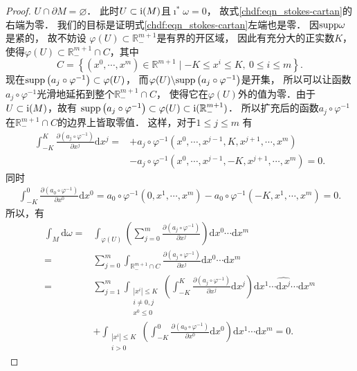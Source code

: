 \begin{proof}
     $U \cap \partial M=\varnothing$．
    此时$U \subset {\rm i}(M)$且$\imath^* \omega=0$，
    故式\eqref{chdf:eqn_stokes-cartan}的右端为零．
    我们的目标是证明式\eqref{chdf:eqn_stokes-cartan}左端也是零．
    因${\rm supp} \omega$是紧的，
    故不妨设 $\varphi(U) \subset \mathbb{R}_{-}^{m+1}$是有界的开区域，
    因此有充分大的正实数$K$，使得$ \varphi(U) \subset \mathbb{R}_{-}^{m+1} \cap C$，其中
    \begin{equation}\label{chdf:eqn_sc-C}
    	C=\left\{\left(x^0, \cdots, x^m\right) \in \mathbb{R}^{m+1} \mid 
    	-K \leqslant x^i \leqslant K, \ 0 \leqslant i \leqslant m \right\} .
    \end{equation}
    现在${\rm supp}\left(a_j \circ \varphi^{-1}\right) \subset \varphi(U)$，
    而$\varphi(U) \backslash {\rm supp}\left(a_j \circ \varphi^{-1}\right)$是开集，
    所以可以让函数$a_j \circ \varphi^{-1}$光滑地延拓到整个$\mathbb{R}_{-}^{m+1} \cap C$，
    使得它在$\varphi(U)$外的值为零．由于$U \subset {\rm i}(M)$，故有
    ${\rm supp}\left(a_j \circ \varphi^{-1}\right) \subset \varphi(U) \subset {\rm i} (\mathbb{R}_{-}^{m+1})$．
    所以扩充后的函数$a_j \circ \varphi^{-1}$在$\mathbb{R}_{-}^{m+1} \cap C$的边界上皆取零值．
    这样，对于$1 \leqslant j \leqslant m$ 有
    \begin{align*}
    	\int_{-K}^K \frac{\partial\left(a_j \circ \varphi^{-1}\right)}{\partial x^j} \mathrm{d} x^j 
    	= & +a_j \circ \varphi^{-1}\left(x^0, \cdots, x^{j-1}, K, x^{j+1}, \cdots, x^m\right) \\
    	& -a_j \circ \varphi^{-1}\left(x^0, \cdots, x^{j-1},-K, x^{j+1}, \cdots, x^m\right) 
    	=  0.
    \end{align*}
    同时
    \begin{align*}
    \int_{-K}^0 \frac{\partial\left(a_0 \circ \varphi^{-1}\right)}{\partial x^0} \mathrm{d} x^0
    =a_0 \circ \varphi^{-1}\left(0, x^1, \cdots, x^{m} \right)
    -a_0 \circ \varphi^{-1}\left(-K, x^1, \cdots, x^{m} \right)    =0.
    \end{align*}
    所以，有
    \begin{align*}
    		\int_M \mathrm{d} \omega= & \int_{\varphi(U)}\left(\sum_{j=0}^m 
    		\frac{\partial\left(a_j \circ \varphi^{-1}\right)}{\partial x^j}\right) \mathrm{d} x^0 \cdots \mathrm{d} x^m \\
    		= & \sum_{j=0}^m \int_{\mathbb{R}_{-}^{m+1} \cap C} \frac{\partial\left(a_j \circ \varphi^{-1}\right)}{\partial x^j} 
    		\mathrm{d} x^0 \cdots \mathrm{d} x^m \\
    		= & \sum_{j=1}^{m} \int_{\substack{|x^i| \leqslant K \\ i \neq 0, j \\ x^0 \leqslant 0}}
    			\left(\int_{-K}^K \frac{\partial\left(a_j \circ \varphi^{-1}\right)}{\partial x^j} 
    			\mathrm{d} x^j\right) \mathrm{d} x^1 \cdots \widehat{\mathrm{d}x^j}  \cdots \mathrm{d} x^m \\
    		& +\int_{\substack{|x^i| \leqslant K \\  i > 0}}
    			\left(\int_{-K}^0 \frac{\partial\left(a_0 \circ \varphi^{-1}\right)}{\partial x^0} \mathrm{d} x^0\right) 
    			\mathrm{d} x^1 \cdots \mathrm{d} x^{m}=0 .
    \end{align*}
    

\end{proof}
